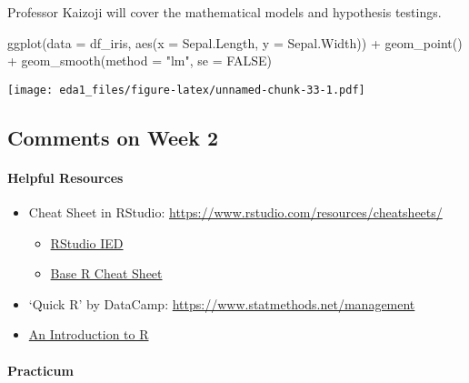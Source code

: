 \documentclass[
]{article}
\newenvironment{Shaded}{\begin{snugshade}}{\end{snugshade}}
\newcommand{\AttributeTok}[1]{\textcolor[rgb]{0.77,0.63,0.00}{#1}}
\newcommand{\ConstantTok}[1]{\textcolor[rgb]{0.00,0.00,0.00}{#1}}
\newcommand{\FunctionTok}[1]{\textcolor[rgb]{0.00,0.00,0.00}{#1}}
\newcommand{\NormalTok}[1]{#1}
\newcommand{\SpecialCharTok}[1]{\textcolor[rgb]{0.00,0.00,0.00}{#1}}
\newcommand{\StringTok}[1]{\textcolor[rgb]{0.31,0.60,0.02}{#1}}
\providecommand{\tightlist}{%
  \setlength{\itemsep}{0pt}\setlength{\parskip}{0pt}}
\begin{document}
Professor Kaizoji will cover the mathematical models and hypothesis
testings.

\begin{Shaded}
\begin{Highlighting}[]
\FunctionTok{ggplot}\NormalTok{(}\AttributeTok{data =}\NormalTok{ df\_iris, }\FunctionTok{aes}\NormalTok{(}\AttributeTok{x =}\NormalTok{ Sepal.Length, }\AttributeTok{y =}\NormalTok{ Sepal.Width)) }\SpecialCharTok{+}
  \FunctionTok{geom\_point}\NormalTok{() }\SpecialCharTok{+}
  \FunctionTok{geom\_smooth}\NormalTok{(}\AttributeTok{method =} \StringTok{"lm"}\NormalTok{, }\AttributeTok{se =} \ConstantTok{FALSE}\NormalTok{)}
\end{Highlighting}
\end{Shaded}

\texttt{[image: eda1\_files/figure-latex/unnamed-chunk-33-1.pdf]}

\hypertarget{comments-on-week-2}{%
\subsection{Comments on Week 2}\label{comments-on-week-2}}

\hypertarget{helpful-resources}{%
\paragraph{Helpful Resources}\label{helpful-resources}}

\begin{itemize}
\item
  Cheat Sheet in RStudio:
  \url{https://www.rstudio.com/resources/cheatsheets/}

  \begin{itemize}
  \tightlist
  \item
    \href{https://raw.githubusercontent.com/rstudio/cheatsheets/main/rstudio-ide.pdf}{RStudio
    IED}
  \item
    \href{https://github.com/rstudio/cheatsheets/raw/main/base-r.pdf}{Base
    R Cheat Sheet}
  \end{itemize}
\item
  `Quick R' by DataCamp: \url{https://www.statmethods.net/management}
\item
  \href{https://cran.rstudio.com}{An Introduction to R}
\end{itemize}

\hypertarget{practicum-1}{%
\paragraph{Practicum}\label{practicum-1}}
\end{document}
